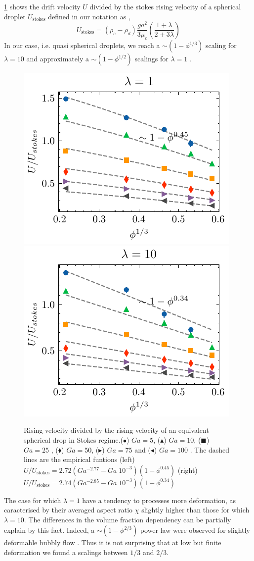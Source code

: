 \ref{fig:U} shows the drift velocity $U$ divided by the stokes rising velocity of a spherical droplet $U_\text{stokes}$ defined in our notation as \citep{kim2013microhydrodynamics}, 
\begin{equation*}
    U_\text{stokes}
    = (\rho_c - \rho_d)\frac{g a^2}{3\mu_c}\left(\frac{1+\lambda}{2 + 3\lambda}\right)
\end{equation*}
In our case, i.e. quasi spherical droplets, we reach a $\sim (1 - \phi^{1/3})$ scaling for $\lambda = 10$ and approximately a $\sim (1 - \phi^{1/2})$ scalings for $\lambda = 1$ .
\begin{figure}[h!]
    \centering
    \includegraphics[height = 0.35\textwidth]{image/HOMOGENEOUS/fCA/UstokesGa_mu_r_1-0.pdf}
    \includegraphics[height = 0.35\textwidth]{image/HOMOGENEOUS/fCA/UstokesGa_mu_r_0-1.pdf}
    \caption{Rising velocity divided by the rising velocity of an equivalent spherical drop in Stokes regime.($\bullet$) $Ga = 5$, ($\blacktriangle$) $Ga = 10$, ($\blacksquare$) $Ga = 25$ , ($\blacklozenge$) $Ga = 50$, ($\blacktriangleright$) $Ga = 75$ and ($\blacktriangleleft$) $Ga = 100$ . 
    The dashed lines are the empirical funtions (left)  
    $U/U_\text{stokes} = 2.72(Ga^{-2.77} - Ga\;10^{-3}) (1 - \phi^{0.45})$
    (right)  $U/U_\text{stokes} = 2.74(Ga^{-2.85} - Ga \;10^{-3}) (1 - \phi^{0.34})$ }
    \label{fig:U}
\end{figure}

The case for which $\lambda = 1$ have a tendency to processes more deformation, as caracterised by their averaged aspect ratio $\chi$ slightly higher than those for which $\lambda = 10$. 
The differences in the volume fraction dependency can be partially explain by this fact. 
Indeed, a  $\sim (1 - \phi^{2/3})$ power law were observed for slightly deformable bubbly flow \cite{zhang2021direct}. 
Thus it is not surprising that at low but finite deformation we found a scalings between $1/3$ and $2/3$. 

